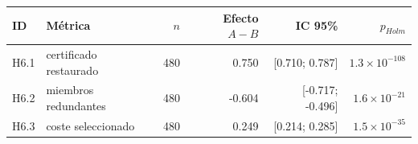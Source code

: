 \begin{tabular}{llrrrr}
\toprule
ID & Métrica & $n$ & Efecto $A-B$ & IC 95\% & $p_{Holm}$ \\
\midrule
H6.1 & certificado restaurado & 480 & 0.750 & [0.710; 0.787] & \(1.3\times10^{-108}\) \\
H6.2 & miembros redundantes & 480 & -0.604 & [-0.717; -0.496] & \(1.6\times10^{-21}\) \\
H6.3 & coste seleccionado & 480 & 0.249 & [0.214; 0.285] & \(1.5\times10^{-35}\) \\
\bottomrule
\end{tabular}
